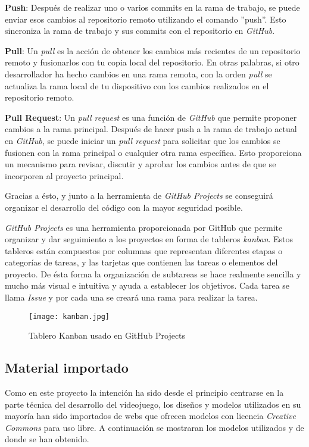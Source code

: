 \textbf{Push}: Después de realizar uno o varios commits en la rama de trabajo, se puede enviar esos cambios al repositorio remoto utilizando el comando ''push''. Esto sincroniza la rama de trabajo y sus commits con el repositorio en \textit{GitHub}.

\textbf{Pull}: Un \textit{pull} es la acción de obtener los cambios más recientes de un repositorio remoto y fusionarlos con tu copia local del repositorio. En otras palabras, si otro desarrollador ha hecho cambios en una rama remota, con la orden \textit{pull} se actualiza la rama local de tu dispositivo con los cambios realizados en el repositorio remoto.

\textbf{Pull Request}: Un \textit{pull request} es una función de \textit{GitHub} que permite proponer cambios a la rama principal. Después de hacer push a la rama de trabajo actual en \textit{GitHub}, se puede iniciar un \textit{pull request} para solicitar que los cambios se fusionen con la rama principal o cualquier otra rama específica. Esto proporciona un mecanismo para revisar, discutir y aprobar los cambios antes de que se incorporen al proyecto principal.

Gracias a ésto, y junto a la herramienta de \textit{GitHub Projects} se conseguirá organizar el desarrollo del código con la mayor seguridad posible.

\textit{GitHub Projects} es una herramienta proporcionada por GitHub que permite organizar y dar seguimiento a los proyectos en forma de tableros \textit{kanban}. Estos tableros están compuestos por columnas que representan diferentes etapas o categorías de tareas, y las tarjetas que contienen las tareas o elementos del proyecto. De ésta forma la organización de subtareas se hace realmente sencilla y mucho más visual e intuitiva y ayuda a establecer los objetivos. Cada tarea se llama \textit{Issue} y por cada una se creará una rama para realizar la tarea. 

\begin{figure}[H]
    \centering
    \texttt{[image: kanban.jpg]}
    \caption{Tablero Kanban usado en GitHub Projects}
\end{figure}

\subsection{Material importado}

Como en este proyecto la intención ha sido desde el principio centrarse en la parte técnica del desarrollo
del videojuego, los diseños y modelos utilizados en su mayoría han sido importados de webs que
ofrecen modelos con licencia \textit{Creative Commons} para uso libre. A continuación se mostraran los modelos utilizados 
y de donde se han obtenido.\\

